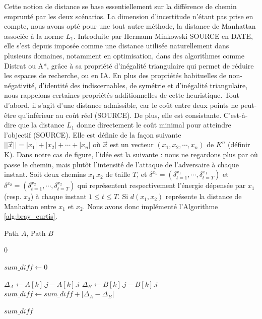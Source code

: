 \documentclass[12pt, a4paper, twoside]{article}
\numberwithin{equation}{section}
\begin{document}
	Cette notion de distance se base essentiellement sur la différence de chemin emprunté par les deux scénarios. La dimension d'incertitude n'étant pas prise en compte, nous avons opté pour une tout autre méthode, la distance de Manhattan associée à la norme $L_1$. Introduite par Hermann Minkowski SOURCE en DATE, elle s'est depuis imposée comme une distance utilisée naturellement dans plusieurs domaines, notamment en optimisation, dans des algorithmes comme Distrat ou A*, grâce à sa propriété d'inégalité triangulaire qui permet de réduire les espaces de recherche, ou en IA. En plus des propriétés habituelles de non-négativité, d’identité des indiscernables, de symétrie et d'inégalité triangulaire, nous rappelons certaines propriétés additionnelles de cette heuristique. Tout d'abord, il s'agit d'une distance admissible, car le coût entre deux points ne peut-être qu'inférieur au coût réel (SOURCE). De plus, elle est consistante. C'est-à-dire que la distance $L_1$ donne directement le coût minimal pour atteindre l'objectif (SOURCE). Elle est définie de la façon suivante $||\Vec{x}||=|x_1|+|x_2|+\cdots+|x_n|$ où $\Vec{x}$ est un vecteur $(x_1, x_2, \cdots, x_n)$ de $K^n$ (définir K). Dans notre cas de figure, l'idée est la suivante : nous ne regardons plus par où passe le chemin, mais plutôt l'intensité de l'attaque de l'adversaire à chaque instant. Soit deux chemins $x_1\, x_2$ de taille $T$, et $\delta^{x_1}=(\delta_{t=1}^{x_1}, \cdots, \delta_{t=T}^{x_1})$ et $\delta^{x_2}=(\delta_{t=1}^{x_2}, \cdots, \delta_{t=T}^{x_2})$ qui représentent respectivement l'énergie dépensée par $x_1$ (resp. $x_2$) à chaque instant $1\leq t\leq T$. Si $d(x_1, x_2)$ représente la distance de Manhattan entre $x_1$ et $x_2$. Nous avons donc implémenté l'Algorithme \ref{alg:bray_curtis}.
	
	\begin{algorithm}[H]
		\caption{Calculation of the Manhattan distance}
		\label{alg:bray_curtis}
		\begin{algorithmic}[1]
			\Require Path $A$, Path $B$
			
			 
			\State \Return $0$
			\EndIf
			
			\State $sum\_diff \gets 0$
			
    			\State $\Delta_A \gets A[k].j - A[k].i$ 
    			\State $\Delta_B \gets B[k].j - B[k].i$            
    			\State $sum\_diff \gets sum\_diff + |\Delta_A - \Delta_B|$ 
			\EndFor
			
			\State \Return $sum\_diff$
		\end{algorithmic}
	\end{algorithm}
	
\end{document}
